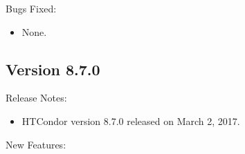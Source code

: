 \noindent Bugs Fixed:

\begin{itemize}

\item None.

\end{itemize}

\subsection*{\label{sec:New-8-7-0}Version 8.7.0}

\noindent Release Notes:

\begin{itemize}

\item HTCondor version 8.7.0 released on March 2, 2017.

\end{itemize}


\noindent New Features:

